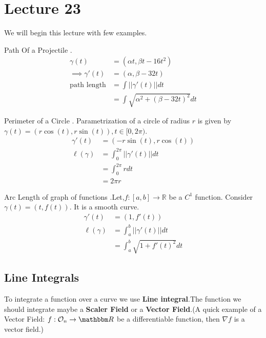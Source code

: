 \documentclass[Analysis-3]{subfiles}
\begin{document}
\chapter*{Lecture 23} %
\setcounter{chapter}{23} %
\setcounter{section}{0}
We will begin this lecture with few examples.
\begin{Eg}{Path Of a Projectile}{}
    . \begin{align*}
        \gamma(t)           & =(\alpha t,\beta t-16t^2)                \\
        \implies \gamma'(t) & = (\alpha ,\beta -32t)                   \\
        \text{path length}  & = \int||\gamma'(t)|| dt                  \\
                            & = \int \sqrt{\alpha^2 +(\beta-32t)^2} dt
    \end{align*}
\end{Eg}

\begin{Eg}{Perimeter of a Circle}{}
    . Parametrization of a circle of radius $r$ is given by $\gamma(t) = (r\cos(t),r\sin(t)), t \in [0,2\pi)$.
    \begin{align*}
        \gamma'(t)    & = (-r\sin(t),r\cos(t))              \\
        \ell (\gamma) & = \int_{0}^{2\pi} ||\gamma'(t)|| dt \\
                      & = \int_{0}^{2\pi} r dt              \\
                      & = 2\pi r
    \end{align*}
\end{Eg}

\begin{Eg}{Arc Length of graph of functions}{}
    .Let,$f : [a,b]\to \mathbb{R}$ be a $C^1$ function. Consider $\gamma(t)=(t,f(t))$. It is a smooth curve.
    \begin{align*}
        \gamma'(t)    & = (1,f'(t))                          \\
        \ell (\gamma) & = \int_{a}^{b} ||\gamma'(t)|| dt     \\
                      & = \int_{a}^{b} \sqrt{1 + f'(t)^2} dt
    \end{align*}
\end{Eg}

\section{Line Integrals}
To integrate a function over a curve we use \textbf{Line integral}.The function we should integrate maybe a \textbf{Scaler Field} or a \textbf{Vector Field}.(A quick example of a Vector Field: $f : \mathcal{O}_n \to \R$ be a differentiable function, then $\nabla f$ is a vector field.)
\end{document}

